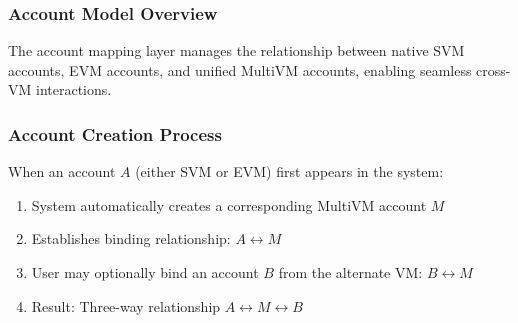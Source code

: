 \documentclass[11pt,a4paper]{article}
\begin{document}
\subsubsection{Account Model Overview}
The account mapping layer manages the relationship between native SVM accounts, EVM accounts, and unified MultiVM accounts, enabling seamless cross-VM interactions.

\subsubsection{Account Creation Process}
When an account $A$ (either SVM or EVM) first appears in the system:
\begin{enumerate}
    \item System automatically creates a corresponding MultiVM account $M$
    \item Establishes binding relationship: $A \leftrightarrow M$
    \item User may optionally bind an account $B$ from the alternate VM: $B \leftrightarrow M$
    \item Result: Three-way relationship $A \leftrightarrow M \leftrightarrow B$
\end{enumerate}
\end{document}
